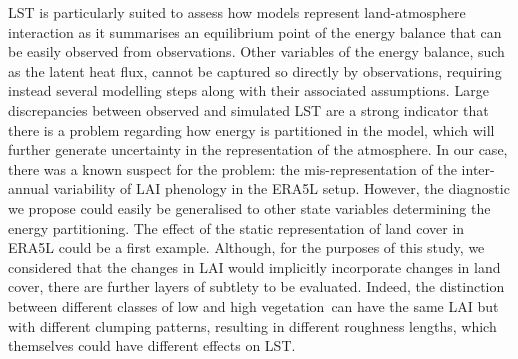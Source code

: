 \documentclass[gmd, manuscript]{copernicus}
\begin{document}
{LST is particularly suited to assess how models represent
land-atmosphere interaction as it summarises an equilibrium point of the
energy balance that can be easily observed from observations. Other
variables of the energy balance, such as the latent heat flux, cannot be
captured so directly by observations, requiring instead several
modelling steps along with their associated assumptions. Large
discrepancies between observed and simulated LST are a strong indicator
that there is a problem regarding how energy is partitioned in the
model, which will further generate uncertainty in the representation of
the atmosphere. In our case, there was a known suspect for the problem:
the mis-representation of the inter-annual variability of LAI phenology
in the ERA5L setup. However, the diagnostic we propose could easily be
generalised to other state variables determining the energy
partitioning. The effect of the static representation of land cover in
ERA5L could be a first example. Although, for the purposes of this
study, we considered that the changes in LAI would implicitly
incorporate changes in land cover, there are further layers of subtlety
to be evaluated. Indeed, the distinction between different classes of
low and high vegetation~can have the same LAI but with different
clumping patterns, resulting in different roughness lengths, which
themselves could have different effects on LST. 

}
\end{document}
